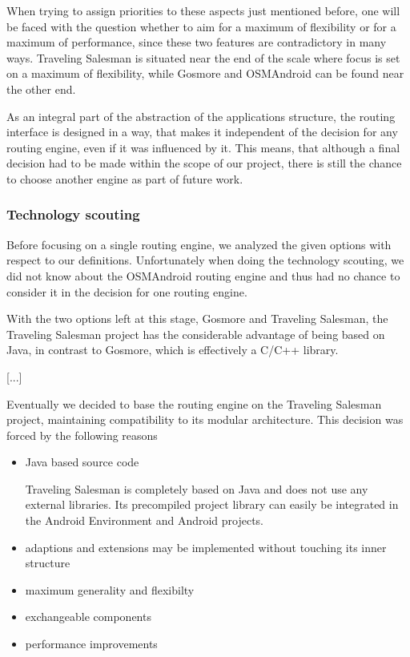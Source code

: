 When trying to assign priorities to these aspects just mentioned before, one will be faced with the question whether to aim for a maximum of flexibility or for a maximum of performance, since these two features are contradictory in many ways. Traveling Salesman is situated near the end of the scale where focus is set on a maximum of flexibility, while Gosmore and OSMAndroid can be found near the other end.\newline

As an integral part of the abstraction of the applications structure, the routing interface is designed in a way, that makes it independent of the decision for any routing engine, even if it was influenced by it. This means, that although a final decision had to be made within the scope of our project, there is still the chance to choose another engine as part of future work.\newline

\subsubsection{Technology scouting}

Before focusing on a single routing engine, we analyzed the given options with respect to our definitions. Unfortunately when doing the technology scouting, we did not know about the OSMAndroid routing engine and thus had no chance to consider it in the decision for one routing engine.\newline

With the two options left at this stage, Gosmore and Traveling Salesman, the Traveling Salesman project has the considerable advantage of being based on Java, in contrast to Gosmore, which is effectively a C/C++ library.\newline



[...]

Eventually we decided to base the routing engine on the Traveling Salesman project, maintaining compatibility to its modular architecture. This decision was forced by the following reasons

\begin{itemize}
	\item Java based source code
	
		Traveling Salesman is completely based on Java and does not use any external libraries. Its precompiled project library can easily be integrated in the Android Environment and Android projects.
	
	\item adaptions and extensions may be implemented without touching its inner structure
	
	\item maximum generality and flexibilty
	
	\item exchangeable components
	
	\item performance improvements
	
\end{itemize}



